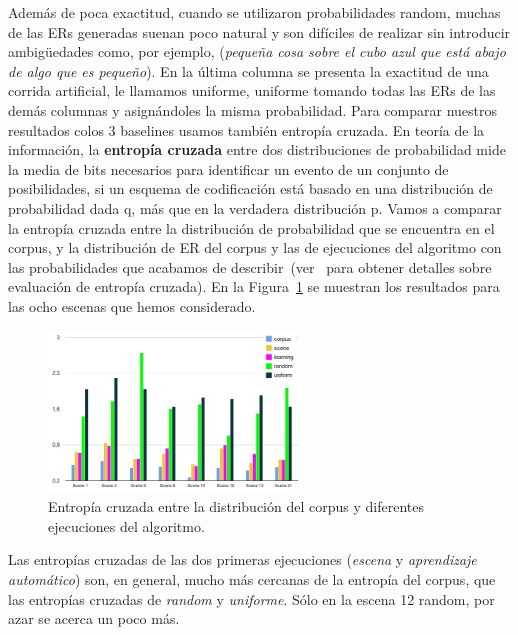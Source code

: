 \begin{table}[H]
Adem\'as de poca exactitud, cuando se utilizaron probabilidades random,  muchas de las ERs generadas suenan poco natural y son dif\'iciles de realizar sin introducir ambig\"uedades como, por ejemplo, (\textit{peque\~na cosa sobre
el cubo azul que est\'a abajo de algo que es peque\~no}). En la \'ultima columna se presenta la exactitud de una corrida artificial, le llamamos uniforme, uniforme tomando todas las ERs de las dem\'as columnas y asign\'andoles la misma probabilidad.
Para comparar nuestros resultados colos 3 baselines usamos tambi\'en entrop\'ia cruzada.
En teor\'ia de la informaci\'on, la \textbf{entrop\'ia cruzada} entre dos distribuciones de probabilidad mide la media de bits necesarios para identificar un evento de un conjunto de posibilidades, si un esquema de codificaci\'on est\'a basado en una distribuci\'on de probabilidad dada q, m\'as que en la verdadera distribuci\'on p. Vamos a comparar la entrop\'ia cruzada entre la distribuci\'on de probabilidad que se encuentra en el corpus, y la distribuci\'on de ER del corpus y las de ejecuciones del algoritmo con las probabilidades que acabamos de describir~(ver~\cite{juraksky:spee08} para obtener detalles sobre evaluaci\'on de entrop\'{i}a cruzada). En la Figura~\ref{Entropy} se muestran los resultados para las ocho escenas que hemos considerado.

\begin{figure}[ht]
\centering
\includegraphics[width=0.6\textwidth]{images/entropy.jpg}
\caption{Entrop\'ia cruzada entre la distribuci\'on del corpus y diferentes ejecuciones del algoritmo.}\label{Entropy}
\end{figure}
  
Las entrop\'{i}as cruzadas de las dos primeras ejecuciones (\emph{escena} y \emph{aprendizaje autom\'atico}) son, en general, mucho m\'as cercanas de la entrop\'{i}a del corpus, que las entrop\'ias cruzadas de \emph{random} y \emph{uniforme}. S\'olo en la escena 12 random, por azar se acerca un poco m\'as.




\end{table}
